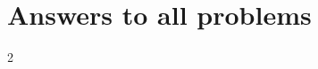 \documentclass[pagenumber]{book}
\numberwithin{section}{chapter}
\numberwithin{equation}{chapter}
\theoremstyle{definition}
\begin{document}

\chapter*{Answers to all problems}
\begin{multicols}{2}
	\raggedcolumns
	\shipoutAnswer
\end{multicols}

\begin{appendices}
	\appendixpage
	\noappendicestocpagenum
	\addappheadtotoc
\end{appendices}


    \printindex   
\backmatter
\end{document}
